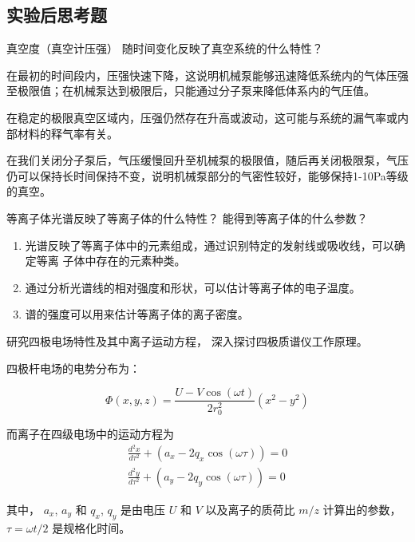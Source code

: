 \documentclass[dvipsnames, svgnames,a4paper,11pt]{article}
\begin{document}
	
\subsection{实验后思考题}

\begin{question}
	真空度（真空计压强） 随时间变化反映了真空系统的什么特性？
\end{question}


	在最初的时间段内，压强快速下降，这说明机械泵能够迅速降低系统内的气体压强至极限值；在机械泵达到极限后，只能通过分子泵来降低体系内的气压值。

	在稳定的极限真空区域内，压强仍然存在升高或波动，这可能与系统的漏气率或内部材料的释气率有关。

	在我们关闭分子泵后，气压缓慢回升至机械泵的极限值，随后再关闭极限泵，气压仍可以保持长时间保持不变，说明机械泵部分的气密性较好，能够保持1-10Pa等级的真空。

	
\begin{question}
	等离子体光谱反映了等离子体的什么特性？ 能得到等离子体的什么参数？
\end{question}

	\begin{enumerate}
		\item 光谱反映了等离子体中的元素组成，通过识别特定的发射线或吸收线，可以确定等离
		子体中存在的元素种类。
		\item 通过分析光谱线的相对强度和形状，可以估计等离子体的电子温度。
		\item 谱的强度可以用来估计等离子体的离子密度。
	\end{enumerate}


\begin{question}
	研究四极电场特性及其中离子运动方程， 深入探讨四极质谱仪工作原理。
\end{question}

	四极杆电场的电势分布为：

	\[
		\Phi(x,y,z) = \frac{U - V \cos(\omega t)}{2 r_0^2} (x^2 - y^2)
	\]

	而离子在四级电场中的运动方程为
	\begin{equation*}
		\begin{split}
			\frac{d^2 x}{d \tau^2} + (a_x - 2 q_x \cos(\omega \tau)) = 0	\\
			\frac{d^2 y}{d \tau^2} + (a_y - 2 q_y \cos(\omega \tau)) = 0
		\end{split}
	\end{equation*}

	其中， $a_x$, $a_y$ 和 $q_x$, $q_y$ 是由电压 $U$ 和 $V$ 以及离子的质荷比 $m/z$ 计算出的参数， $\tau = ωt/2$ 是规格化时间。
\end{document}
